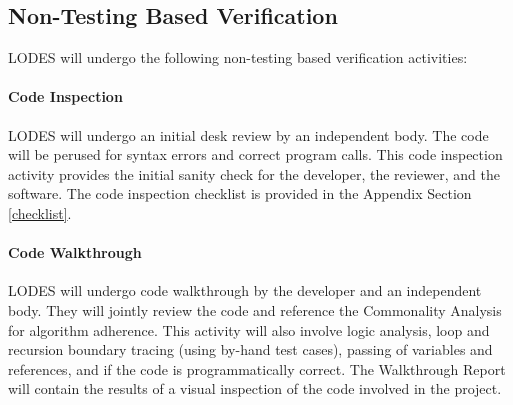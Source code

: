 \documentclass[12pt, titlepage]{article}
\newcommand{\famname}{LODES} %
\begin{document}

		

\subsection{Non-Testing Based Verification}
\famname{} will undergo the following non-testing based verification activities:

\paragraph{Code Inspection\\}
\famname{} will undergo an initial desk review by an independent body.  The code
will be perused for syntax errors and correct program calls.  This code
inspection activity provides the initial sanity check for the developer, the
reviewer, and the software. The code inspection checklist
is provided in the Appendix Section \ref{checklist}.


\paragraph{Code Walkthrough\\}
\famname{} will undergo code walkthrough by the developer and an independent
body.  They will jointly review the code and reference the Commonality Analysis
for algorithm adherence. This activity will also involve logic analysis, loop
and recursion boundary tracing (using by-hand test cases), passing of variables
and references, and if the code is programmatically correct.
The Walkthrough Report will contain the results of a visual inspection of the code involved in the project.
\end{document}
